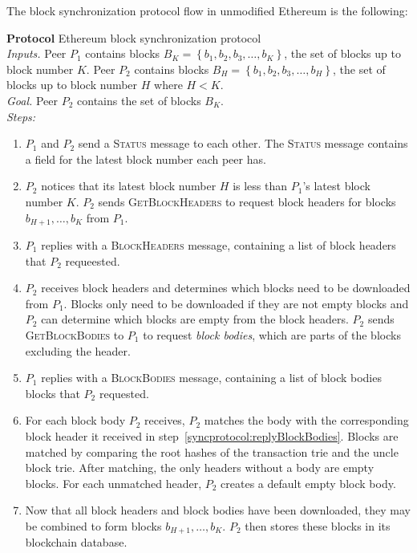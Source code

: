 \documentclass[12pt]{article}
\makeatletter
\newcounter{protocol}
\newenvironment{protocol}[1]
  {\par\addvspace{\topsep}
   \noindent
   \tabularx{\linewidth}{@{} X @{}}
    \hline
    \refstepcounter{protocol}\textbf{Protocol \theprotocol} #1 \\
    \hline}
  { \\
    \hline
   \endtabularx
   \par\addvspace{\topsep}}
\newcommand{\sbline}{\\[.5\normalbaselineskip]}%
\newcommand{\set}[1]{\left\{#1\right\}}
\makeatother
\begin{document}
The block synchronization protocol flow in unmodified Ethereum is the following:
\begin{protocol}{Ethereum block synchronization protocol}
  \emph{Inputs.} Peer $P_1$ contains blocks $B_K = \set{b_{1}, b_{2}, b_{3}, \ldots, b_{K}}$, the set of blocks up to block number $K$. Peer $P_2$ contains blocks $B_H = \set{b_{1}, b_{2}, b_{3}, \ldots, b_{H}}$, the set of blocks up to block number $H$ where $H < K$.
  \sbline
  \emph{Goal.} Peer $P_2$ contains the set of blocks $B_K$.
  \sbline
  \emph{Steps:}
  \begin{enumerate}
    \item $P_1$ and $P_2$ send a \textsc{Status} message to each other. The \textsc{Status} message contains a field for the latest block number each peer has.
    \item $P_2$ notices that its latest block number $H$ is less than $P_1$'s latest block number $K$. $P_2$ sends \textsc{GetBlockHeaders} to request block headers for blocks $b_{H + 1}, \ldots, b_{K}$ from $P_1$. \label{syncprotocol:requestBlockHeaders}
    \item $P_1$ replies with a \textsc{BlockHeaders} message, containing a list of block headers that $P_2$ requeested. \label{syncprotocol:replyBlockHeaders}
    \item $P_2$ receives block headers and determines which blocks need to be downloaded from $P_1$. Blocks only need to be downloaded if they are not empty blocks and $P_2$ can determine which blocks are empty from the block headers. $P_2$ sends \textsc{GetBlockBodies} to $P_1$ to request \emph{block bodies}, which are parts of the blocks excluding the header. \label{syncprotocol:requestBlockBodies}
    \item $P_1$ replies with a \textsc{BlockBodies} message, containing a list of block bodies blocks that $P_2$ requested. \label{syncprotocol:replyBlockBodies}
    \item For each block body $P_2$ receives, $P_2$ matches the body with the corresponding block header it received in step~\ref{syncprotocol:replyBlockBodies}. Blocks are matched by comparing the root hashes of the transaction trie and the uncle block trie. After matching, the only headers without a body are empty blocks. For each unmatched header, $P_2$ creates a default empty block body. \label{syncprotocol:match}
    \item Now that all block headers and block bodies have been downloaded, they may be combined to form blocks $b_{H + 1}, \ldots, b_{K}$. $P_2$ then stores these blocks in its blockchain database. \label{syncprotocol:reconstruct}
  \end{enumerate}
\end{protocol}
\end{document}
